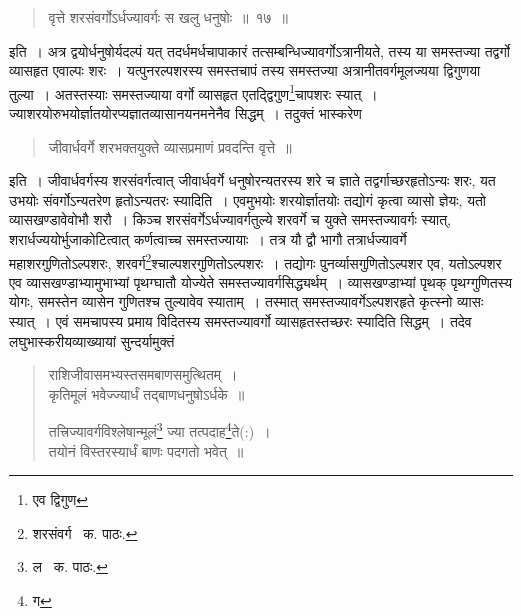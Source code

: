 \documentclass[11pt, openany]{book}
\begin{document}
\begin{quote}
{\ab वृत्ते शरसंवर्गोऽर्धज्यावर्गः स खलु धनुषोः~॥~१७~॥}
\end{quote}

इति~। अत्र द्वयोर्धनुषोर्यदल्पं यत् तदर्धमर्धचापाकारं तत्सम्बन्धिज्यावर्गोऽत्रानीयते, तस्य या समस्तज्या तद्वर्गो व्यासहृत एवाल्पः शरः~। यत्पुनरल्पशरस्य समस्तचापं तस्य समस्तज्या अत्रानीतवर्गमूलज्यया द्विगुणया तुल्या~। अतस्तस्याः समस्तज्याया वर्गो व्यासहृत एतद्द्विगुण\renewcommand{\thefootnote}{१}\footnote{एव द्विगुण}चापशरः स्यात्~। ज्याशरयोरुभयोर्ज्ञातयोरप्यज्ञातव्यासानयनमनेनैव सिद्धम्~। तदुक्तं भास्करेण\textendash

\begin{quote}
{\qt जीवार्धवर्गे शरभक्तयुक्ते व्यासप्रमाणं प्रवदन्ति वृत्ते~॥}
\end{quote}

\noindent इति~। जीवार्धवर्गस्य शरसंवर्गत्वात् जीवार्धवर्गे धनुषोरन्यतरस्य शरे च ज्ञाते तद्वर्गाच्छरहृतोऽन्यः शरः, यत उभयोः संवर्गोऽन्यतरेण हृतोऽन्यतरः स्यादिति~। एवमुभयोः शरयोर्ज्ञातयोः तद्योगं कृत्वा व्यासो ज्ञेयः, यतो व्यासखण्डावेवोभौ शरौ~। किञ्च शरसंवर्गेऽर्धज्यावर्गतुल्ये शरवर्गे च युक्ते समस्तज्यावर्गः स्यात्, शरार्धज्ययोर्भुजाकोटित्वात् कर्णत्वाच्च समस्तज्यायाः~। तत्र यौ द्वौ भागौ तत्रार्धज्यावर्गे महाशरगुणितोऽल्पशरः, शरवर्ग\renewcommand{\thefootnote}{२}\footnote{शरसंवर्ग \textendash\ क. पाठः.}श्चाल्पशरगुणितोऽल्पशरः~। तद्योगः पुनर्व्यासगुणितोऽल्पशर एव, यतोऽल्पशर एव व्यासखण्डाभ्यामुभाभ्यां पृथग्घातौ योज्येते समस्तज्यावर्गसिद्ध्यर्थम्~। व्यासखण्डाभ्यां पृथक् पृथग्गुणितस्य योगः, समस्तेन व्यासेन गुणितश्च तुल्यावेव स्याताम्~। तस्मात् समस्तज्यावर्गेऽल्पशरहृते कृत्स्नो व्यासः स्यात्~। एवं समचापस्य प्रमाय विदितस्य समस्तज्यावर्गो व्यासहृतस्तच्छरः स्यादिति सिद्धम्~। तदेव लघुभास्करीयव्याख्यायां सुन्दर्यामुक्तं\textendash

\newpage

\begin{quote}
{\qt राशिजीवासमभ्यस्तसमबाणसमुत्थितम्~।\\
कृतिमूलं भवेज्ज्यार्धं तद्बाणधनुषोऽर्धके~॥

तत्त्रिज्यावर्गविश्लेषान्मूलं\renewcommand{\thefootnote}{१}\footnote{ल \textendash\ क. पाठः.}  ज्या तत्पदाह\renewcommand{\thefootnote}{२}\footnote{ग}ते(:)~।\\
तयोनं विस्तरस्यार्धं बाणः पदगतो भवेत्~॥}
\end{quote}
\end{document}
